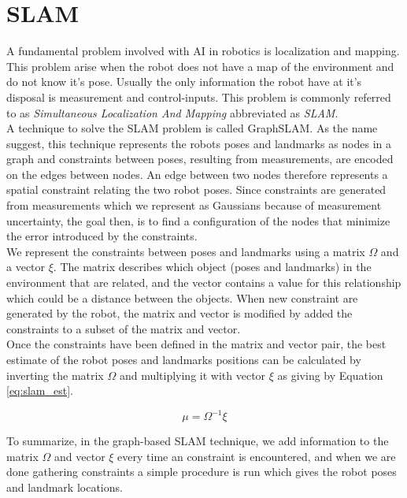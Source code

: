 
\section{SLAM}

A fundamental problem involved with AI in robotics is localization and mapping. This problem arise when the robot does not have a map of the environment and do not know it's pose. Usually the only information the robot have at it's disposal is measurement and control-inputs. This problem is commonly referred to as \textit{Simultaneous Localization And Mapping} abbreviated as \textit{SLAM}.\\

A technique to solve the SLAM problem is called GraphSLAM. As the name suggest, this technique represents the robots poses and landmarks as nodes in a graph and constraints between poses, resulting from measurements, are encoded on the edges between nodes. An edge between two nodes therefore represents a spatial constraint relating the two robot poses. Since constraints are generated from measurements which we represent as Gaussians because of measurement uncertainty, the goal then, is to find a configuration of the nodes that minimize the error introduced by the constraints.\\

We represent the constraints between poses and landmarks using a matrix $\Omega$ and a vector $\xi$. The matrix describes which object (poses and landmarks) in the environment that are related, and the vector contains a value for this relationship which could be a distance between the objects. When new constraint are generated by the robot, the matrix and vector is modified by added the constraints to a subset of the matrix and vector.\\

Once the constraints have been defined in the matrix and vector pair, the best estimate of the robot poses and landmarks positions can be calculated by inverting the matrix $\Omega$ and multiplying it with vector $\xi$ as giving by Equation \ref{eq:slam_est}.

\begin{equation}
\label{eq:slam_est}
\mu = \Omega^{-1}\xi
\end{equation}

To summarize, in the graph-based SLAM technique, we add information to the matrix $\Omega$ and vector $\xi$ every time an constraint is encountered, and when we are done gathering constraints a simple procedure is run which gives the robot poses and landmark locations.

